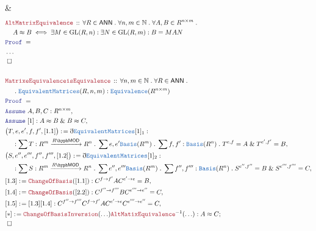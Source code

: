 \documentclass[12pt]{scrartcl}
\newcommand{\TYPE}[1]{\textcolor{NavyBlue}{\mathtt{#1}}}
\newcommand{\LOGIC}[1]{\textcolor{Blue}{\mathtt{#1}}}
\newcommand{\THM}[1]{\textcolor{Maroon}{\mathtt{#1}}}
\renewcommand{\.}{\; . \;}
\newcommand{\de}{: \kern 0.1pc =}
\newcommand{\Theorem}[2]{& \THM{#1} \, :: \, #2 \\ & \Proof = \\ }
\newcommand{\NewLine}{\\ & \kern 1pc}
\newcommand{\Page}[1]{ \begin{align*} #1 \end{align*}   }
\newcommand{ \bd }{ \ByDef }
\newcommand{\NoProof}{ & \ldots \\ \EndProof}
\renewcommand{\And}{\; \& \;}
\newcommand{\Nat}{\mathbb{N} }
\newcommand{\Say}[3]{& #1 \de #2 : #3, \\}
\newcommand{\Conclude}[3]{& #1 \de #2 : #3; \\}
\newcommand{\Assume}[2]{& \LOGIC{Assume} \; #1 : #2, \\}
\newcommand{\QED}{\; \square}
\newcommand{\EndProof}{& \QED \\}
\newcommand{\ByDef}{\eth}
\newcommand{\Proof}{\LOGIC{Proof} \; }
\newcommand{\Arrow}[1]{\xrightarrow{#1}}
\newcommand{\GL}{\mathrm{GL}}
\newcommand{\LMOD}[1]{#1\hyph\mathsf{MOD}}
\newcommand{\ANN}{\mathsf{ANN}}
\begin{document}
{	\EndProof
}\Page{
	\Theorem{AltMatrixEquivalence}
	{
		\forall R \in \ANN \. \forall n,m \in \Nat \. 
		\forall A,B \in R^{n\times m} \. \NewLine 
		A \approx B \iff \exists M \in \GL(R,n) : \exists N \in \GL(R,m) :
		B = MAN
	}
	\NoProof
	\\
	\Theorem{MatrixeEquivalenceisEquivalence}
	{
		\forall n,m \in \Nat \. \forall  R \in \ANN \. \NewLine \. \TYPE{EquivalentMatrices}(R,n,m) : \TYPE{Equivalence}(R^{n\times m})
	}
	\Assume{A,B,C}{R^{n\times m}}
	\Assume{[1]}{A \approx B \And B \approx C}
	\Say{\big(T,e,e',f,f',[1.1]\big)}{\bd \TYPE{EquivalentMatrices}[1]_1}{ 
		\NewLine : \sum T : R^m \Arrow{\LMOD{R}} R^n \.
		\sum e,e'  \TYPE{Basis}(R^m) \. 
		\sum f,f' : \TYPE{Basis}(R^n) \.
		 T^{e,f} = A \And T^{e',f'} = B
	}
	\Say{\big(S,e'',e''',f'',f''',[1.2]\big)}{\bd \TYPE{EquivalentMatrices}[1]_2}{ 
		\NewLine : \sum S : R^m \Arrow{\LMOD{R}} R^n \.
		\sum e'',e'''  \TYPE{Basis}(R^m) \. 
		\sum f'',f''' : \TYPE{Basis}(R^n) \. 
		 S^{e'',f''} = B \And S^{e''',f'''} = C
	}
	\Say{[1.3]}{\THM{ChangeOfBasis}([1.1])}{C^{f \to f'}AC^{e' \to e} = B}
	\Say{[1.4]}{\THM{ChangeOfBasis}([2.2])}{C^{f'' \to f'''}BC^{e''' \to e''} = C}
	\Say{[1.5]}{[1.3][1.4]}{C^{f'' \to f'''}C^{f \to f'}A C^{e' \to e}C^{e''' \to e''} = C}
	\Conclude{[*]}{ \THM{ChangeOfBasisInversion}(\ldots)\THM{AltMatixEquivalence}^{-1}(\ldots)}
	{
		A \approx C
	}
	\EndProof
}
\newpage
\end{document}
